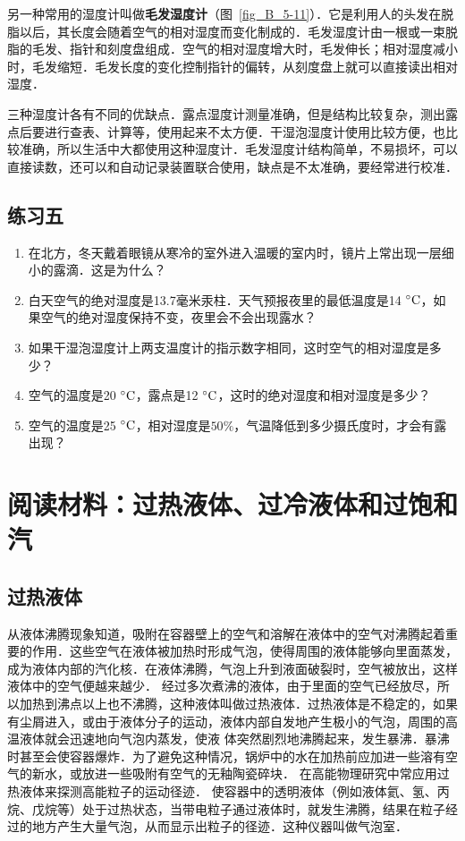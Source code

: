 另一种常用的湿度计叫做\textbf{毛发湿度计}（图~\ref{fig_B_5-11}）．它是利用人的头发在脱脂以后，其长度会随着空气的相对湿度而变化制成的．毛发湿度计由一根或一束脱脂的毛发、指针和刻度盘组成．空气的相对湿度增大时，毛发伸长；相对湿度减小时，毛发缩短．毛发长度的变化控制指针的偏转，从刻度盘上就可以直接读出相对湿度．

三种湿度计各有不同的优缺点．露点湿度计测量准确，但是结构比较复杂，测出露点后要进行查表、计算等，使用起来不太方便．干湿泡湿度计使用比较方便，也比较准确，所以生活中大都使用这种湿度计．毛发湿度计结构简单，不易损坏，可以直接读数，还可以和自动记录装置联合使用，缺点是不太准确，要经常进行校准．

\subsection*{练习五}

\begin{enumerate}
\item 在北方，冬天戴着眼镜从寒冷的室外进入温暖的室内时，镜片上常出现一层细小的露滴．这是为什么？
\item 白天空气的绝对湿度是13.7毫米汞柱．天气预报夜里的最低温度是14$\;{}^\circ\text{C}$，如果空气的绝对湿度保持不变，夜里会不会出现露水？
\item 如果干湿泡湿度计上两支温度计的指示数字相同，这时空气的相对湿度是多少？
\item 空气的温度是20$\;{}^\circ\text{C}$，露点是12$\;{}^\circ\text{C}$，这时的绝对湿度和相对湿度是多少？
\item 空气的温度是25$\;{}^\circ\text{C}$，相对湿度是$50\%$，气温降低到多少摄氏度时，才会有露出现？
\end{enumerate}

\section*{阅读材料：过热液体、过冷液体和过饱和汽}
\subsection*{过热液体} 

从液体沸腾现象知道，吸附在容器壁上的空气和溶解在液体中的空气对沸腾起着重要的作用．这些空气在液体被加热时形成气泡，使得周围的液体能够向里面蒸发，成为液体内部的汽化核．在液体沸腾，气泡上升到液面破裂时，空气被放出，这样液体中的空气便越来越少．
经过多次煮沸的液体，由于里面的空气已经放尽，所以加热到沸点以上也不沸腾，这种液体叫做过热液体．过热液体是不稳定的，如果有尘屑进入，或由于液体分子的运动，液体内部自发地产生极小的气泡，周围的高温液体就会迅速地向气泡内蒸发，使液
体突然剧烈地沸腾起来，发生暴沸．暴沸时甚至会使容器爆炸．为了避免这种情况，锅炉中的水在加热前应加进一些溶有空气的新水，或放进一些吸附有空气的无釉陶瓷碎块．
在高能物理研究中常应用过热液体来探测高能粒子的运动径迹．
使容器中的透明液体（例如液体氦、氢、丙烷、戊烷等）处于过热状态，当带电粒子通过液体时，就发生沸腾，结果在粒子经过的地方产生大量气泡，从而显示出粒子的径迹．这种仪器叫做气泡室．


